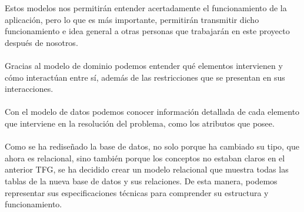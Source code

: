 \documentclass[11pt]{book}
\begin{document}
Estos modelos nos permitirán entender acertadamente el funcionamiento de la aplicación, pero lo que es más importante, permitirán transmitir dicho funcionamiento e idea general a otras personas que trabajarán en este proyecto después de nosotros.\\\\
Gracias al modelo de dominio podemos entender qué elementos intervienen y cómo interactúan entre sí, además de las restricciones que se presentan en sus interacciones.\\\\
Con el modelo de datos podemos conocer información detallada de cada elemento que interviene en la resolución del problema, como los atributos que posee.\\\\
Como se ha rediseñado la base de datos, no solo porque ha cambiado su tipo, que ahora es relacional, sino también porque los conceptos no estaban claros en el anterior TFG, se ha decidido crear un modelo relacional que muestra todas las tablas de la nueva base de datos y sus relaciones. De esta manera, podemos representar sus especificaciones técnicas para comprender su estructura y funcionamiento. 
\end{document}
